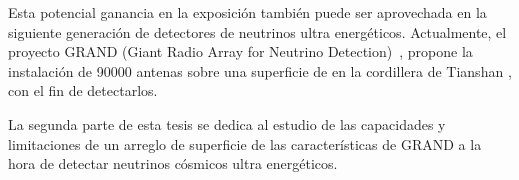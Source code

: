 Esta potencial ganancia en la exposici\'on tambi\'en puede ser aprovechada en la siguiente generaci\'on de detectores de neutrinos ultra energ\'eticos. 
Actualmente, el proyecto GRAND (Giant Radio Array for Neutrino Detection)~\cite{cite:grand_prop}, propone la instalaci\'on de 90000 antenas sobre una superficie de  en la cordillera de Tianshan \cite{cite:grand_tec}, con el fin de detectarlos.

La segunda parte de esta tesis se dedica al estudio de las capacidades y limitaciones de un arreglo de superficie de las caracter\'isticas de GRAND a la hora de detectar neutrinos cósmicos ultra energéticos.

